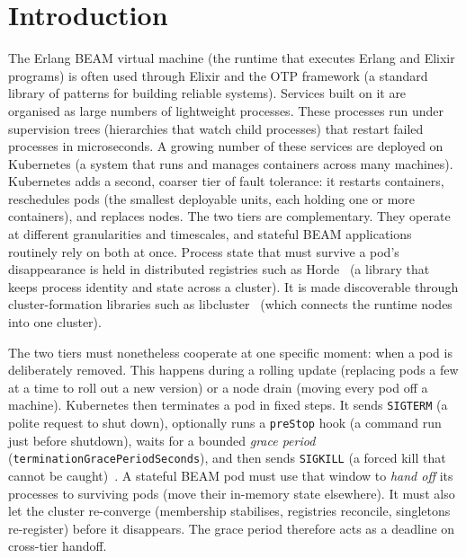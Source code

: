 \documentclass[AMA,Times1COL]{WileyNJDv5}
\begin{document}
\maketitle

\section{Introduction}\label{sec:intro}

The Erlang BEAM virtual machine (the runtime that executes Erlang and Elixir programs) is often used
through Elixir and the OTP framework (a standard library of patterns for building reliable systems).
Services built on it are organised as large numbers of lightweight processes. These processes run under
supervision trees (hierarchies that watch child processes) that restart failed processes in
microseconds. A growing number of these services are deployed on Kubernetes (a system that runs and
manages containers across many machines). Kubernetes adds a second, coarser tier of fault tolerance: it
restarts containers, reschedules pods (the smallest deployable units, each holding one or more
containers), and replaces nodes. The two tiers are complementary. They operate at different
granularities and timescales, and stateful BEAM applications routinely rely on both at once. Process
state that must survive a pod's disappearance is held in distributed registries such as
Horde~\cite{horde} (a library that keeps process identity and state across a cluster). It is made
discoverable through cluster-formation libraries such as libcluster~\cite{libcluster} (which connects
the runtime nodes into one cluster).

The two tiers must nonetheless cooperate at one specific moment: when a pod is deliberately removed.
This happens during a rolling update (replacing pods a few at a time to roll out a new version) or a
node drain (moving every pod off a machine). Kubernetes then terminates a pod in fixed steps. It sends
\texttt{SIGTERM} (a polite request to shut down), optionally runs a \texttt{preStop} hook (a command
run just before shutdown), waits for a bounded \emph{grace period}
(\texttt{terminationGracePeriodSeconds}), and then sends \texttt{SIGKILL} (a forced kill that cannot be
caught)~\cite{k8sgraceful}. A stateful BEAM pod must use that window to \emph{hand off} its processes to
surviving pods (move their in-memory state elsewhere). It must also let the cluster re-converge
(membership stabilises, registries reconcile, singletons re-register) before it disappears. The grace
period therefore acts as a deadline on cross-tier handoff.
\end{document}

